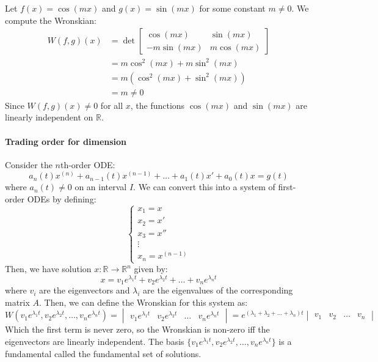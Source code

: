 \documentclass[11pt]{article}
\begin{document}
\begin{example}
    Let $f(x) = \cos (mx)$ and $g(x) = \sin (mx)$ for some constant $m \neq 0$. We compute the Wronskian:
    \begin{align*}
    W(f, g)(x) &= \det\begin{bmatrix}
    \cos(mx) & \sin(mx) \\
    -m\sin(mx) & m\cos(mx)
    \end{bmatrix} \\
    &= m\cos^2(mx) + m\sin^2(mx) \\
    &= m(\cos^2(mx) + \sin^2(mx)) \\
    &= m \neq 0
    \end{align*}
    Since \( W(f, g)(x) \neq 0 \) for all \( x \), the functions \( \cos(mx) \) and \( \sin(mx) \) are linearly independent on \( \mathbb{R} \).
\end{example}
\paragraph{Trading order for dimension} Consider the $n$th-order ODE:
$$a_n(t)x^{(n)} + a_{n-1}(t)x^{(n-1)} + \ldots + a_1(t)x' + a_0(t)x = g(t)$$
where \( a_n(t) \neq 0 \) on an interval \( I \). We can convert this into a system of first-order ODEs by defining:
$$\begin{cases}
x_1 = x \\
x_2 = x' \\
x_3 = x'' \\
\vdots \\
x_n = x^{(n-1)}
\end{cases}$$
Then, we have solution $x: \mathbb{R} \to \mathbb{R}^n$ given by:
$$
x = v_1 e^{\lambda_1 t} + v_2 e^{\lambda_2 t} + \ldots + v_n e^{\lambda_n t}
$$
where \( v_i \) are the eigenvectors and \( \lambda_i \) are the eigenvalues of the corresponding matrix \( A \). Then, we can define the Wronskian for this system as:
\begin{equation}
W(v_1e^{\lambda_1 t}, v_2 e^{\lambda_2 t}, \ldots, v_n e^{\lambda_n t}) = 
\begin{vmatrix}
v_1 e^{\lambda_1 t} & v_2 e^{\lambda_2 t} & \ldots & v_n e^{\lambda_n t} 
\end{vmatrix} = e^{(\lambda_1 + \lambda_2 + \ldots + \lambda_n)t} \begin{vmatrix}
v_1 & v_2 & \ldots & v_n 
\end{vmatrix}
\end{equation}
Which the first term is never zero, so the Wronskian is non-zero iff the eigenvectors are linearly independent. The basis $\{v_1 e^{\lambda_1 t}, v_2 e^{\lambda_2 t}, \ldots, v_n e^{\lambda_n t}\}$ is a fundamental called the fundamental set of solutions.
\end{document}
